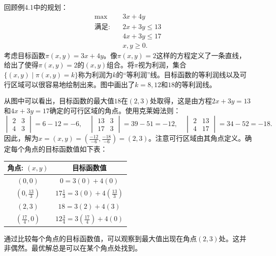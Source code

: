 \begin{translation}
回顾例4.1中的规划：
\[
\begin{aligned}
\max \quad & 3x + 4y \\
\text{满足:} \quad & 2x + 3y \le 13 \\
& 4x + 3y \le 17 \\
& x, y \ge 0.
\end{aligned}
\]
考虑目标函数$\pi(x, y) = 3x + 4y$。像$\pi(x, y) = 2$这样的方程定义了一条直线，给出了使得$\pi(x, y) = 2$的$(x, y)$组合。将$\pi$视为利润，集合$\{(x, y) \mid \pi(x, y) = k\}$称为利润为$k$的``等利润''线。目标函数的等利润线以及可行区域可以很容易地绘制出来。图中画出了$k = 8, 12$和$18$的等利润线。

从图中可以看出，目标函数的最大值$18$在$(2,3)$处取得，这是由方程$2x + 3y = 13$和$4x + 3y = 17$确定的可行区域的角点。使用克莱姆法则：
\[
\begin{vmatrix} 2 & 3 \\ 4 & 3 \end{vmatrix} = 6 - 12 = -6,\quad
\begin{vmatrix} 13 & 3 \\ 17 & 3 \end{vmatrix} = 39 - 51 = -12,\quad
\begin{vmatrix} 2 & 13 \\ 4 & 17 \end{vmatrix} = 34 - 52 = -18.
\]
因此，解为$x = (x, y) = \left(\frac{-12}{-6}, \frac{-18}{-6}\right) = (2,3)$。注意可行区域由其角点定义。确定每个角点的目标函数值如下表：

\begin{center}
\begin{tabular}{cc}
角点: $(x, y)$ & 目标函数值 \\
\hline
$(0, 0)$ & $0 = 3(0) + 4(0)$ \\
$\left(0, \frac{13}{3}\right)$ & $17\frac{1}{3} = 3(0) + 4\left(\frac{13}{3}\right)$ \\
$(2, 3)$ & $18 = 3(2) + 4(3)$ \\
$\left(\frac{17}{4}, 0\right)$ & $12\frac{3}{4} = 3\left(\frac{17}{4}\right) + 4(0)$
\end{tabular}
\end{center}

通过比较每个角点的目标函数值，可以观察到最大值出现在角点$(2,3)$处。这并非偶然。最优解总是可以在某个角点处找到。
\end{translation}


